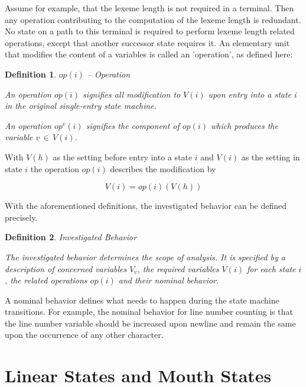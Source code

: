 \documentclass[12pt,a4paper]{scrartcl}
\newtheorem{definition}{Definition}
\begin{document}
Assume for example, that the lexeme length is not required in a terminal. Then
any operation contributing to the computation of the lexeme length is
redundant.  No state on a path to this terminal is required to perform lexeme
length related operations, except that another successor state requires it.  An
elementary unit that modifies the content of a variables is called an
'operation', as defined here:

\begin{definition}
$op(i)$ -- Operation 

An operation $op(i)$ signifies all modification to $V(i)$ upon entry into a
state $i$ in the original single-entry state machine.

An operation $op^v(i)$ signifies the component of $op(i)$ which produces 
the variable $v\,\in\,V(i)$.
\end{definition}
    
With $V(h)$ as the setting before entry into a state $i$ and $V(i)$ as the
setting in state $i$ the operation $op(i)$ describes the modification by 

\begin{equation}
\label{eq:operation}
                         V(i) = op(i)(V(h))
\end{equation}

With the aforementioned definitions, the investigated behavior can be defined
precisely.

\begin{definition}
Investigated Behavior 

The investigated behavior determines the scope of analysis. It is
specified by a description of concerned variables $V_c$, the required
variables $V(i)$ for each state $i$, the related operations $op(i)$ and
their nominal behavior.
\end{definition}
    
A nominal behavior defines what needs to happen during the state machine
transitions.  For example, the nominal behavior for line number counting is
that the line number variable should be increased upon newline and remain the
same upon the occurrence of any other character. 

%
\section{Linear States and Mouth States}
\end{document}
